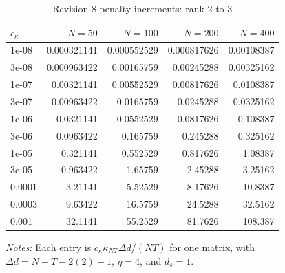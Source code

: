 \begin{table}[!htbp]
\centering
\caption{Revision-8 penalty increments: rank 2 to 3}
\label{tab:ic-penalty-r2}
\begin{tabular}{lrrrr}
\toprule
$c_\kappa$ & $N=50$ & $N=100$ & $N=200$ & $N=400$ \\
\midrule
1e-08 & 0.000321141 & 0.000552529 & 0.000817626 & 0.00108387 \\
3e-08 & 0.000963422 & 0.00165759 & 0.00245288 & 0.00325162 \\
1e-07 & 0.00321141 & 0.00552529 & 0.00817626 & 0.0108387 \\
3e-07 & 0.00963422 & 0.0165759 & 0.0245288 & 0.0325162 \\
1e-06 & 0.0321141 & 0.0552529 & 0.0817626 & 0.108387 \\
3e-06 & 0.0963422 & 0.165759 & 0.245288 & 0.325162 \\
1e-05 & 0.321141 & 0.552529 & 0.817626 & 1.08387 \\
3e-05 & 0.963422 & 1.65759 & 2.45288 & 3.25162 \\
0.0001 & 3.21141 & 5.52529 & 8.17626 & 10.8387 \\
0.0003 & 9.63422 & 16.5759 & 24.5288 & 32.5162 \\
0.001 & 32.1141 & 55.2529 & 81.7626 & 108.387 \\
\bottomrule
\end{tabular}
\begin{minipage}{0.96\linewidth}\footnotesize \textit{Notes:} Each entry is $c_\kappa\kappa_{NT}\Delta d/(NT)$ for one matrix, with $\Delta d=N+T-2(2)-1$, $\eta=4$, and $d_s=1$.\end{minipage}
\end{table}
